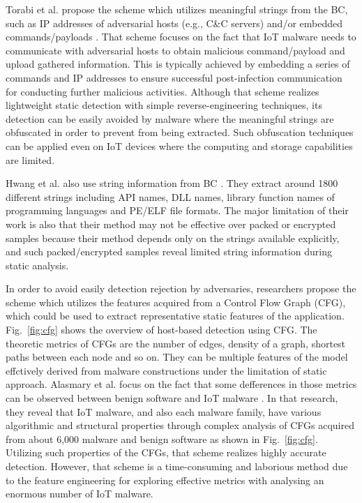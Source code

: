 \documentclass{ieeeaccess}
\newcommand{\myfigurename}{Fig.}
\begin{document}
Torabi et al. propose the scheme which utilizes meaningful strings from the BC, such as IP addresses of adversarial hosts (e.g., C\&C servers) and/or embedded commands/payloads \cite{om}.
That scheme focuses on the fact that IoT malware needs to communicate with adversarial hosts to obtain malicious command/payload and upload gathered information.
This is typically achieved by embedding a series of commands and IP addresses to ensure successful post-infection communication for conducting further malicious activities. 
Although that scheme realizes lightweight static detection with simple reverse-engineering techniques, its detection can be easily avoided by malware where the meaningful strings are obfuscated in order to prevent from being extracted.
Such obfuscation techniques can be applied even on IoT devices where the computing and storage capabilities are limited.

Hwang et al. also use string information from BC \cite{hwang}.
They extract around 1800 different strings including API names, DLL names, library function names of programming languages and PE/ELF file formats.
The major limitation of their work is also that their method may not be effective over packed or encrypted samples because their method depends only on the strings available explicitly, and such packed/encrypted samples reveal limited string information during static analysis.

In order to avoid easily detection rejection by adversaries, researchers \cite{cfg, cfg2} propose the scheme which utilizes the features acquired from a Control Flow Graph (CFG), which could be used to extract representative static features of the application.
\myfigurename~\ref{fig:cfg} shows the overview of host-based detection using CFG.
The theoretic metrics of CFGs are the number of edges, density of a graph, shortest paths between each node and so on.
They can be multiple features of the model effctively derived from malware constructions under the limitation of static approach.
Alasmary et al. focus on the fact that some defferences in those metrics can be observed between benign software and IoT malware \cite{cfg}.
In that research, they reveal that IoT malware, and also each malware family, have various algorithmic and structural properties through complex analysis of CFGs acquired from about 6,000 malware and benign software as shown in \myfigurename~\ref{fig:cfg}. 
Utilizing such properties of the CFGs, that scheme realizes highly accurate detection.
However, that scheme is a time-consuming and laborious method due to the feature engineering for exploring effective metrics with analysing an enormous number of IoT malware.
\end{document}
